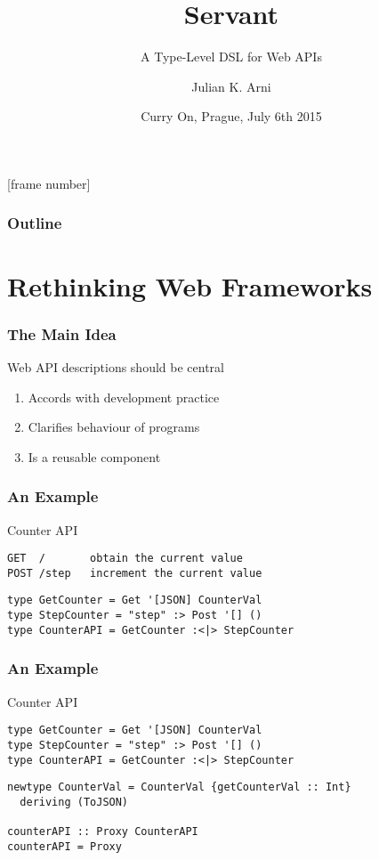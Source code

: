 \documentclass{beamer}
\title{Servant}
\subtitle{A Type-Level DSL for Web APIs}
\author{Julian K. Arni}
\date{Curry On, Prague, July 6th 2015}
\begin{document}
\frame{\titlepage}

[frame number]
\begin{frame}
\frametitle{Outline}
\tableofcontents[]
\end{frame}

\section{Rethinking Web Frameworks}

\begin{frame}
\frametitle{The Main Idea}
\pause
\begin{tcolorbox}
Web API descriptions should be central
\end{tcolorbox}
\pause
\begin{enumerate}
\item Accords with development practice \pause
\item Clarifies behaviour of programs \pause
\item Is a reusable component
\end{enumerate}
\end{frame}

\begin{frame}[fragile]
\frametitle{An Example}
\begin{tcolorbox}{Counter API}
\begin{verbatim}
GET  /       obtain the current value
POST /step   increment the current value
\end{verbatim}
\end{tcolorbox}
\pause
\begin{verbatim}
type GetCounter = Get '[JSON] CounterVal
type StepCounter = "step" :> Post '[] ()
type CounterAPI = GetCounter :<|> StepCounter
\end{verbatim}
\end{frame}

\begin{frame}[fragile]
\frametitle{An Example}
\begin{tcolorbox}{Counter API}
\begin{verbatim}
type GetCounter = Get '[JSON] CounterVal
type StepCounter = "step" :> Post '[] ()
type CounterAPI = GetCounter :<|> StepCounter
\end{verbatim}
\end{tcolorbox}
\pause
\begin{verbatim}
newtype CounterVal = CounterVal {getCounterVal :: Int}
  deriving (ToJSON)

counterAPI :: Proxy CounterAPI
counterAPI = Proxy
\end{verbatim}
\end{frame}
\end{document}
